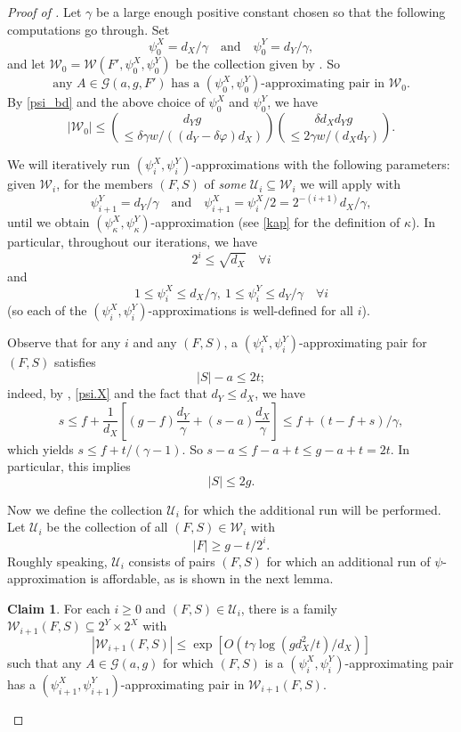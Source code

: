\documentclass[10pt,a4paper]{amsart}
\theoremstyle{definition}
\newtheorem{claim}[thm]{Claim}
\newcommand{\cG}{\mathcal{G} }
\newcommand{\cU}{\mathcal{U} }
\newcommand{\cW}{\mathcal{W} }
\newcommand{\beq}[1]{\begin{equation}\label{#1}}
\newcommand{\enq}[0]{\end{equation}}
\newcommand{\sub}[0]{\subseteq}
\newcommand{\0}[0]{\emptyset}
\begin{document}
\begin{proof}[Proof of ]

Let $\gamma$ be a large enough positive constant chosen so that the following computations go through. Set
\beq{setup} \psi^X_0=d_X/\gamma \quad \text{and} \quad  \psi^Y_0=d_Y/\gamma, \enq
and let $\cW_0=\cW(F', \psi^X_0, \psi^Y_0)$ be the collection given by . So
\beq{container1} \text{any $A \in \cG(a,g,F')$ has a $(\psi^X_0, \psi^Y_0)$-approximating pair in $\cW_0$.}
\enq
By \eqref{psi_bd} and the above choice of $\psi^X_0$ and $\psi^Y_0$, we have
\beq{W0.bd} |\cW_0|\leq {d_Yg \choose \le \delta \gamma w/((d_Y-\delta \varphi)d_X)}{\delta d_X d_Y g \choose \le 2\gamma w/(d_Xd_Y)}. \enq

We will iteratively run $(\psi^X_i, \psi^Y_i)$-approximations with the following parameters: given $\cW_i$, for the members $(F,S)$ of \textit{some} $\cU_i \sub \cW_i$ we will apply  with
\beq{psi.ini} \psi^Y_{i+1}=d_Y/\gamma \quad \text{and} \quad \psi^X_{i+1}=\psi^X_i/2=2^{-(i+1)}d_X/\gamma,\enq
until we obtain $(\psi_\kappa^X, \psi_\kappa^Y)$-approximation (see \eqref{kap} for the definition of $\kappa$). In particular, throughout our iterations, we have
\beq{i.bd} 2^i \le \sqrt {d_X} \quad \forall i\enq
and
\beq{psi.X} 1 \le \psi^X_i\leq d_X/\gamma, \ 1\leq \psi^Y_i \le d_Y/\gamma \quad \forall i\enq
(so each of the $(\psi^X_i, \psi^Y_i)$-approximations is well-defined for all $i$).

Observe that for any $i$ and any $(F,S)$, a $(\psi_i^X, \psi_i^Y)$-approximating pair for $(F,S)$ satisfies
\beq{s.t.bd} |S|-a \le 2t; \enq
indeed, by , \eqref{psi.X} and the fact that $d_Y\leq d_X$, we have 
\[s \le f+\frac{1}{d_X}\left[(g-f)\frac{d_Y}{\gamma}+(s-a)\frac{d_X}{\gamma}\right]\le f+(t-f+s)/\gamma,\]
which yields $s \le f+t/(\gamma-1)$. So $s-a \le f-a+t \le g-a+t=2t.$ In particular, this implies
\beq{s.2g} |S|\leq 2g. \enq


Now we define the collection $\cU_i$ for which the additional run will be performed. Let $\cU_i$ be the collection of all $(F,S)\in \cW_i$ with 
\beq{case3.F} |F| \ge g-t/2^i.\enq
Roughly speaking, $\cU_i$ consists of pairs $(F,S)$ for which an additional run of $\psi$-approximation is affordable, as is shown in the next lemma. 

\begin{claim}\label{iteration.cost}
    For each $i\geq 0$ and $(F,S) \in \cU_i$, there is a family $\cW_{i+1}(F,S) \sub 2^Y \times 2^X$ with
    \[|\cW_{i+1}(F,S)|\le \exp\left[O(t\gamma \log (gd_X^2/t)/d_X)\right]\]
    such that any $A \in \cG(a,g)$ for which $(F,S)$ is a $(\psi^X_i, \psi^Y_i)$-approximating pair has a $(\psi^X_{i+1}, \psi^Y_{i+1})$-approximating pair in $\cW_{i+1}(F,S).$
\end{claim}


\end{proof}
\end{document}
